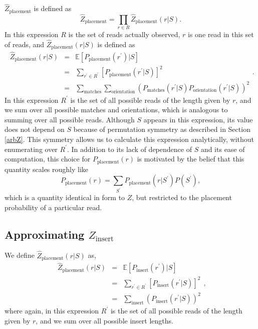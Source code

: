 \documentclass[phd,tocprelim]{cornell}
\begin{document}
$\hat{Z}_{\text{placement}}$ is defined as
\begin{equation}
    \hat{Z}_{\text{placement}} = \prod_{r \in R} \hat{Z}_{\text{placement}}(r|S).
\end{equation}
In this expression $R$ is the set of reads actually observed, $r$ is one read in this set of reads, and $\hat{Z}_{\text{placement}}(r|S)$ is defined as
\begin{equation}
    \begin{array}{lcl}
        \hat{Z}_{\text{placement}}(r|S) & = & \mathbb{E}\left[P_{\text{placement}}\left(r^{\prime}\right)|S\right] \\
        & = & \sum_{r^{\prime} \in R^{\prime}} \left[ P_{\text{placement}}(r^{\prime}|S)\right]^{2} \\
        & = & \sum_{\text{matches}} \sum_{\text{orientation}} \left(P_{\text{matches}}(r^{\prime}|S)P_{\text{orientation}}(r^{\prime}|S)\right)^{2}
    \end{array}.
\end{equation}
In this expression $R^{\prime}$ is the set of all possible reads of the length given by $r$, and we sum over all possible matches and orientations, which is analogous to summing over all possible reads. Although $S$ appears in this expression, its value does not depend on $S$ because of permutation symmetry as described in Section \ref{arbZ}. This symmetry allows us to calculate this expression analytically, without enumerating over $R^{\prime}$.  In addition to its lack of dependence of $S$ and its ease of computation, this choice for $P_{\text{placement}}(r)$ is motivated by the belief that this quantity scales roughly like
\begin{equation}
    P_{\text{placement}}(r) = \sum_{S^{\prime}}P_{\text{placement}}(r|S^{\prime})P(S^{\prime}),
\end{equation}
which is a quantity identical in form to $Z$, but restricted to the placement probability of a particular read.


\subsection{Approximating $Z_{\text{insert}}$} %
\label{sub:Aprroximating Z_insert}

We define $\hat{Z}_{\text{placement}}(r|S)$ as,
\begin{equation}
    \begin{array}{lcl}
        \hat{Z}_{\text{placement}}(r|S) & = & \mathbb{E}\left[P_{\text{insert}}\left(r^{\prime}\right)|S\right] \\
        & = & \sum_{r^{\prime} \in R^{\prime}} \left[ P_{\text{insert}}(r^{\prime}|S)\right]^{2} \\
        & = & \sum_{\text{insert}} \left(P_{\text{insert}}(r^{\prime}|S)\right)^{2}
    \end{array},
\end{equation}
where again, in this expression $R^{\prime}$ is the set of all possible reads of the length given by $r$, and we sum over all possible insert lengths.
\end{document}
